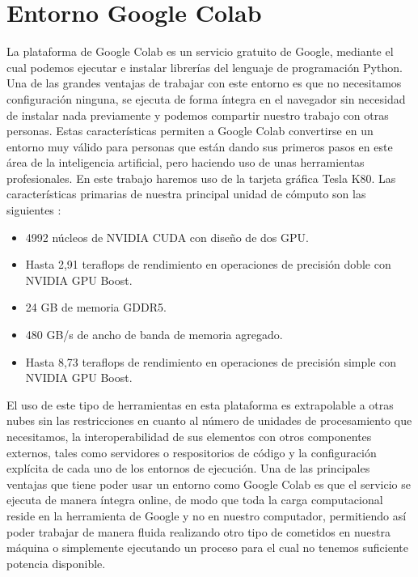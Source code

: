\section{Entorno Google Colab}\label{sec:entorno-google-colab}
La plataforma de Google Colab es un servicio gratuito de Google, mediante el cual podemos ejecutar e instalar librerías del lenguaje de programación Python.
Una de las grandes ventajas de trabajar con este entorno es que no necesitamos configuración ninguna, se ejecuta de forma íntegra en el navegador sin necesidad de instalar nada previamente y podemos compartir
nuestro trabajo con otras personas.
Estas características permiten a Google Colab convertirse en un entorno muy válido para personas que están dando sus primeros pasos en este área de la inteligencia artificial, pero haciendo uso
de unas herramientas profesionales.
En este trabajo haremos uso de la tarjeta gráfica Tesla K80.
Las características primarias de nuestra principal unidad de cómputo son las siguientes :
\begin{itemize}
    \item 4992 núcleos de NVIDIA CUDA con diseño de dos GPU.
    \item Hasta 2,91 teraflops de rendimiento en operaciones de precisión doble con NVIDIA GPU Boost.
    \item 24 GB de memoria GDDR5.
    \item 480 GB/s de ancho de banda de memoria agregado.
    \item Hasta 8,73 teraflops de rendimiento en operaciones de precisión simple con NVIDIA GPU Boost.
\end{itemize}
El uso de este tipo de herramientas en esta plataforma es extrapolable a otras nubes sin las restricciones en cuanto al número de unidades de procesamiento que necesitamos,
la interoperabilidad de sus elementos con otros componentes externos, tales como servidores o respositorios de código y la configuración explícita de cada uno de los entornos de ejecución.
Una de las principales ventajas que tiene poder usar un entorno como Google Colab es que el servicio se ejecuta de manera íntegra online, de modo que toda la carga computacional reside en la herramienta de Google y no en
nuestro computador, permitiendo así poder trabajar de manera fluida realizando otro tipo de cometidos en nuestra máquina o simplemente ejecutando un proceso para el cual no tenemos suficiente potencia disponible.
